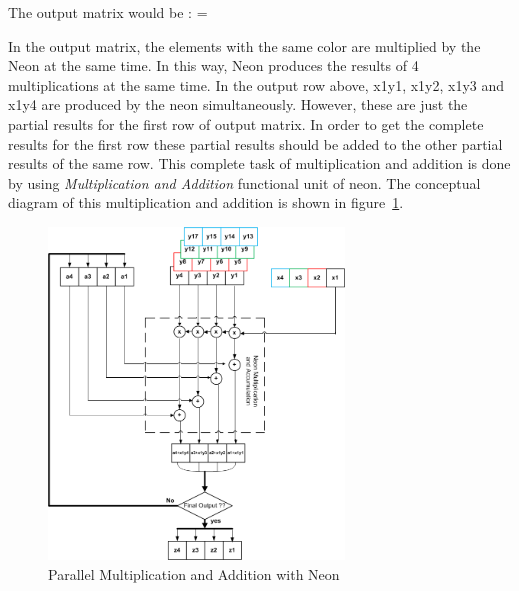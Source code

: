 The output matrix would be :
=
\begin{table}[h]
\end{table}

In the output matrix, the elements with the same color are multiplied by the Neon at the same time. In this way, Neon produces the results of 4 multiplications at the same time. In the output row above, x1y1, x1y2, x1y3 and x1y4 are produced by the neon simultaneously. However, these are just the partial results for the first row of output matrix. In order to get the complete results for the first row these partial results should be added to the other partial results of the same row. This complete task of multiplication and addition is done by using \emph{Multiplication and Addition} functional unit of neon. The conceptual diagram of this multiplication and addition is shown in figure~\ref{fig:neon_mult_add}.

\begin{figure}[h]
\centering 
\includegraphics[width= 0.7\textwidth]{images/MandA}
\caption{Parallel Multiplication and Addition with Neon  }
\label{fig:neon_mult_add}
\end{figure}
